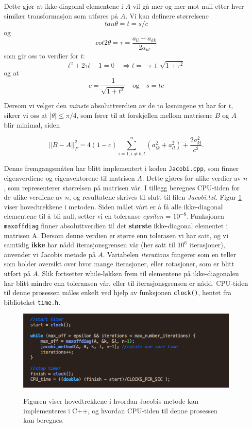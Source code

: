 \documentclass{article}
\begin{document}
Dette gjør at ikke-diagonal elementene i $A$ vil gå mer og mer mot null etter hver similær transformasjon som utføres på $A$. Vi kan definere størrelsene 
\[tan\theta = t = s/c \]
og
\[cot2\theta = \tau = \frac{a_{ll} - a_{kk}}{2a_{kl}} \]
som gir oss to verdier for $t$:
\[t^2 + 2\tau t - 1 = 0 \quad \Rightarrow t = -\tau \pm \sqrt{1 + \tau^2}  \]
og at
\[ c = \frac{1}{\sqrt{1 + t^2}} \quad \textrm{og} \quad s = tc \]

Dersom vi velger den \textit{minste} absoluttverdien av de to løsningene vi har for $t$, sikrer vi oss at |$\theta | \le \pi /4$, som fører til at forskjellen mellom matrisene $B$ og $A$ blir minimal, siden

\[||B - A||_F^2 = 4(1-c) \sum_{i=1, i\neq k,l}^n (a_{ik}^2 + a_{il}^2) + \frac{2a_{kl}^2}{c^2}. \]

Denne fremgangsmåten har blitt implementert i koden \texttt{Jacobi.cpp}, som finner eigenverdiene og eigenvektorene til matrisen $A$. Dette gjøres for ulike verdier av $n$, som representerer størrelsen på matrisen vår. I tillegg beregnes CPU-tiden for de ulike verdiene av $n$, og resultatene skrives til slutt til filen \textit{Jacobi.txt}. Figur \ref{fig:jacobi} viser hovedtrekkene i metoden. Siden målet vårt er å få alle ikke-diagonal elementene til å bli null, setter vi en toleranse \textit{epsilon} = $10^{-8}$. Funksjonen \texttt{maxoffdiag} finner absoluttverdien til det \textbf{største} ikke-diagonal elementet i matrisen A. Dersom denne verdien er større enn tolerasen vi har satt, og vi samtidig \textbf{ikke} har nådd iterasjonsgrensen vår (her satt til $10^6$ iterasjoner), anvender vi Jacobis metode på $A$. Variabelen \textit{iterations} fungerer som en teller som holder oversikt over hvor mange iterasjoner, eller rotasjoner, som er blitt utført på $A$. Slik fortsetter while-løkken frem til elementene på ikke-diagonalen har blitt mindre enn toleransen vår, eller til iterasjonsgrensen er nådd. CPU-tiden til denne prosessen måles enkelt ved hjelp av funksjonen \texttt{clock()}, hentet fra biblioteket \texttt{time.h}.

\FloatBarrier
\begin{figure}[!ht]
  \begin{center}
  \includegraphics[width = 130mm]{jacobi_method.png}\\
  \caption{Figuren viser hovedtrekkene i hvordan Jacobis metode kan implementeres i C++, og hvordan CPU-tiden til denne prosessen kan beregnes.}\label{fig:jacobi}
  \end{center}
\end{figure}
\FloatBarrier
\end{document}
